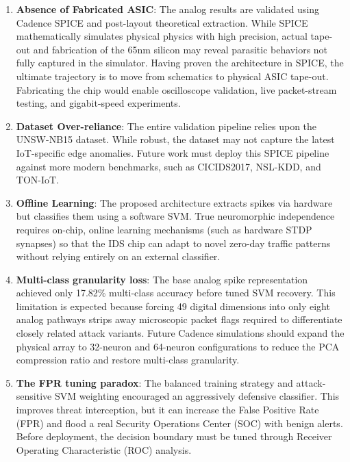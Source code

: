 \documentclass{ieeeaccess}
\begin{document}
\begin{enumerate}
\item \textbf{Absence of Fabricated ASIC}: The analog results are validated using Cadence SPICE and post-layout theoretical extraction. While SPICE mathematically simulates physical physics with high precision, actual tape-out and fabrication of the 65nm silicon may reveal parasitic behaviors not fully captured in the simulator. Having proven the architecture in SPICE, the ultimate trajectory is to move from schematics to physical ASIC tape-out. Fabricating the chip would enable oscilloscope validation, live packet-stream testing, and gigabit-speed experiments.

\item \textbf{Dataset Over-reliance}: The entire validation pipeline relies upon the UNSW-NB15 dataset. While robust, the dataset may not capture the latest IoT-specific edge anomalies. Future work must deploy this SPICE pipeline against more modern benchmarks, such as CICIDS2017, NSL-KDD, and TON-IoT.

\item \textbf{Offline Learning}: The proposed architecture extracts spikes via hardware but classifies them using a software SVM. True neuromorphic independence requires on-chip, online learning mechanisms (such as hardware STDP synapses) so that the IDS chip can adapt to novel zero-day traffic patterns without relying entirely on an external classifier.

\item \textbf{Multi-class granularity loss}: The base analog spike representation achieved only 17.82\% multi-class accuracy before tuned SVM recovery. This limitation is expected because forcing 49 digital dimensions into only eight analog pathways strips away microscopic packet flags required to differentiate closely related attack variants. Future Cadence simulations should expand the physical array to 32-neuron and 64-neuron configurations to reduce the PCA compression ratio and restore multi-class granularity.

\item \textbf{The FPR tuning paradox}: The balanced training strategy and attack-sensitive SVM weighting encouraged an aggressively defensive classifier. This improves threat interception, but it can increase the False Positive Rate (FPR) and flood a real Security Operations Center (SOC) with benign alerts. Before deployment, the decision boundary must be tuned through Receiver Operating Characteristic (ROC) analysis.
\end{enumerate}
\end{document}
